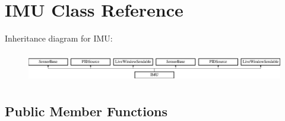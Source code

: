 \hypertarget{class_i_m_u}{}\section{I\+M\+U Class Reference}
\label{class_i_m_u}
Inheritance diagram for I\+M\+U\+:\begin{figure}[H]
\begin{center}
\leavevmode
\includegraphics[height=1.323877cm]{class_i_m_u}
\end{center}
\end{figure}
\subsection*{Public Member Functions}
